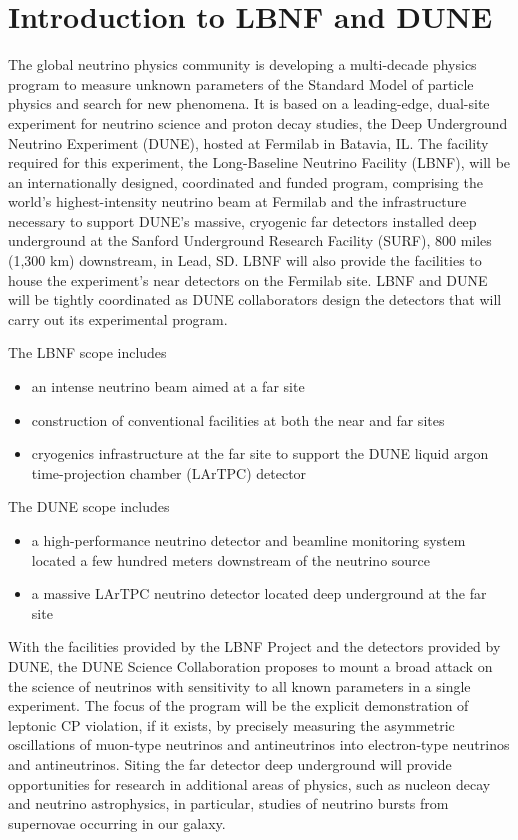 
\section{Introduction to LBNF and DUNE}
\label{sec:intro-lbnfdune-eachvol}

The global neutrino physics community is developing a multi-decade physics program to measure unknown parameters of the Standard Model of particle physics and search for new phenomena.   It is based on a leading-edge, dual-site experiment
for neutrino science and proton decay studies, the Deep Underground Neutrino Experiment 
(DUNE), hosted at Fermilab in Batavia, IL. The facility required for this experiment, the Long-Baseline 
Neutrino Facility (LBNF), will be an internationally designed, coordinated and funded program, comprising 
the world's highest-intensity neutrino beam at Fermilab and the infrastructure necessary to support 
DUNE's massive, cryogenic far detectors installed deep underground at the Sanford Underground 
Research Facility (SURF), 800 miles (1,300 km) downstream, in Lead, SD. LBNF will also provide the 
facilities to house the experiment's near detectors on the Fermilab site. LBNF and DUNE will be tightly coordinated as DUNE collaborators design the detectors that will carry out its experimental program. 
  
The LBNF scope includes 
\begin{itemize}
\item an intense neutrino beam aimed at a far site
\item construction of conventional facilities at both the near and far sites
\item cryogenics infrastructure at the far site to support the DUNE liquid argon time-projection
chamber (LArTPC) detector
\end{itemize}

The DUNE scope includes
\begin{itemize}
\item %
a high-performance neutrino detector and beamline monitoring system located a few hundred meters downstream of the neutrino source
\item a massive LArTPC neutrino detector located deep underground at the far site
\end{itemize}

With the facilities provided by the LBNF Project and the detectors provided by DUNE, the DUNE Science Collaboration proposes to mount a broad attack on the science of neutrinos with sensitivity 
to all known parameters in a single experiment.  The focus of the program will be the explicit 
demonstration of leptonic CP violation, if it exists, by precisely measuring the asymmetric oscillations of 
muon-type neutrinos and antineutrinos into electron-type neutrinos and antineutrinos.
Siting the far detector deep underground will provide
opportunities for research in additional areas of physics, such as nucleon decay and neutrino
astrophysics, in particular, studies of neutrino bursts from supernovae occurring in our galaxy.

